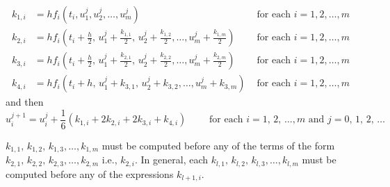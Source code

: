 \documentclass[../main-sheet.tex]{subfiles}
\begin{document}
\begin{align*}
    k_{1,i}&=hf_i(t_i,u_1^j,u_2^j,\dots,u_m^j) &\text{ for each } i=1,2,\dots,m\\
    k_{2,i}&=hf_i\left(t_i+\frac{h}{2},\,u_1^j+\frac{k_{1,1}}{2},\,u_2^j+\frac{k_{1,2}}{2},\dots,u_m^j+\frac{k_{1,m}}{2}\right) &\text{ for each } i=1,2,\dots,m\\
    k_{3,i}&=hf_i\left(t_i+\frac{h}{2},\,u_1^j+\frac{k_{2,1}}{2},\,u_2^j+\frac{k_{2,2}}{2},\dots,u_m^j+\frac{k_{2,m}}{2}\right) &\text{ for each } i=1,2,\dots,m\\
    k_{4,i}&=hf_i\left(t_i+h,\,u_1^j+k_{3,1},\,u_2^j+k_{3,2},\dots,u_m^j+k_{3,m}\right) &\text{ for each } i=1,2,\dots,m
\end{align*}
and then
\[
    u_i^{j+1}=u_i^j+\frac{1}{6}\left( k_{1,i}+2k_{2,i}+2k_{3,i} +k_{4,i}\right)\qquad \text{ for each }i=1,\,2,\,\dots,m \text{ and } j=0,\,1,\,2,\,\dots
\]
\begin{note}
    \(k_{1,1},\,k_{1,2},\,k_{1,3},\dots,k_{1,m}\) must be computed before any of the terms of the form \(k_{2,1},\,k_{2,2},\,k_{2,3},\dots,k_{2,m}\) i.e., \(k_{2,i}\). 
    In general, each \(k_{l,1},\,k_{l,2},\,k_{l,3},\dots,k_{l,m}\) must be computed before any of the expressions \(k_{l+1,i}\).
\end{note}
\end{document}
